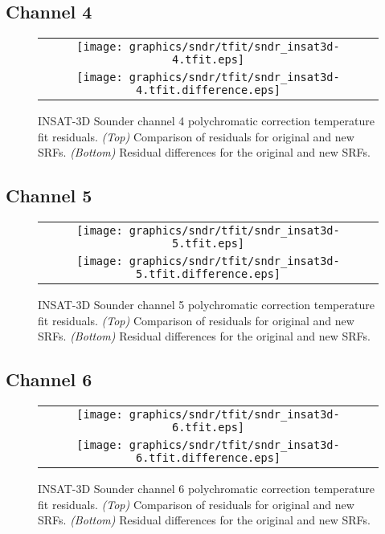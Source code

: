 \subsection{Channel 4}
\begin{figure}[H]
  \label{fig:sndr_ch4_tfit}
  \centering
  \begin{tabular}{c}
    \texttt{[image: graphics/sndr/tfit/sndr\_insat3d-4.tfit.eps]} \\
    \texttt{[image: graphics/sndr/tfit/sndr\_insat3d-4.tfit.difference.eps]}
  \end{tabular}
  \caption{INSAT-3D Sounder channel 4 polychromatic correction temperature fit residuals. \emph{(Top)} Comparison of residuals for original and new SRFs. \emph{(Bottom)} Residual differences for the original and new SRFs.}
\end{figure}

\subsection{Channel 5}
\begin{figure}[H]
  \label{fig:sndr_ch5_tfit}
  \centering
  \begin{tabular}{c}
    \texttt{[image: graphics/sndr/tfit/sndr\_insat3d-5.tfit.eps]} \\
    \texttt{[image: graphics/sndr/tfit/sndr\_insat3d-5.tfit.difference.eps]}
  \end{tabular}
  \caption{INSAT-3D Sounder channel 5 polychromatic correction temperature fit residuals. \emph{(Top)} Comparison of residuals for original and new SRFs. \emph{(Bottom)} Residual differences for the original and new SRFs.}
\end{figure}

\subsection{Channel 6}
\begin{figure}[H]
  \label{fig:sndr_ch6_tfit}
  \centering
  \begin{tabular}{c}
    \texttt{[image: graphics/sndr/tfit/sndr\_insat3d-6.tfit.eps]} \\
    \texttt{[image: graphics/sndr/tfit/sndr\_insat3d-6.tfit.difference.eps]}
  \end{tabular}
  \caption{INSAT-3D Sounder channel 6 polychromatic correction temperature fit residuals. \emph{(Top)} Comparison of residuals for original and new SRFs. \emph{(Bottom)} Residual differences for the original and new SRFs.}
\end{figure}


